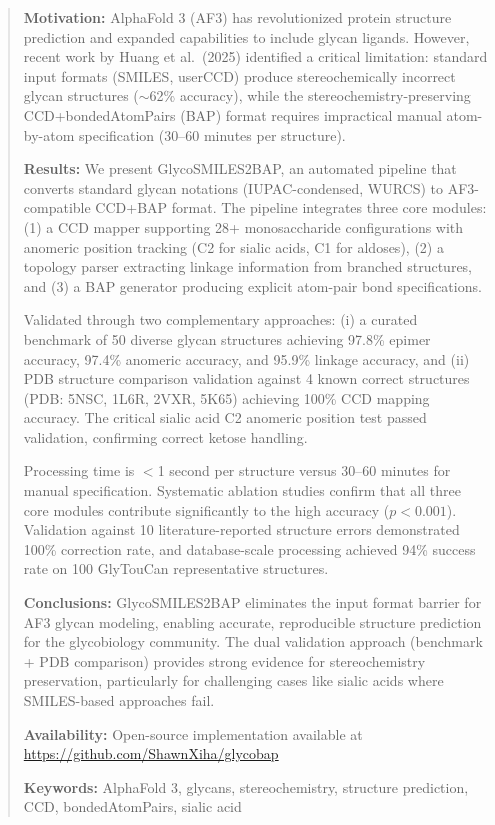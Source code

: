 
\begin{abstract}

\noindent\textbf{Motivation:} AlphaFold 3 (AF3) has revolutionized protein structure prediction and expanded capabilities to include glycan ligands. However, recent work by Huang et al.\ (2025) identified a critical limitation: standard input formats (SMILES, userCCD) produce stereochemically incorrect glycan structures ($\sim$62\% accuracy), while the stereochemistry-preserving CCD+bondedAtomPairs (BAP) format requires impractical manual atom-by-atom specification (30--60 minutes per structure).

\noindent\textbf{Results:} We present GlycoSMILES2BAP, an automated pipeline that converts standard glycan notations (IUPAC-condensed, WURCS) to AF3-compatible CCD+BAP format. The pipeline integrates three core modules: (1) a CCD mapper supporting 28+ monosaccharide configurations with anomeric position tracking (C2 for sialic acids, C1 for aldoses), (2) a topology parser extracting linkage information from branched structures, and (3) a BAP generator producing explicit atom-pair bond specifications. 

Validated through two complementary approaches: (i) a curated benchmark of 50 diverse glycan structures achieving 97.8\% epimer accuracy, 97.4\% anomeric accuracy, and 95.9\% linkage accuracy, and (ii) PDB structure comparison validation against 4 known correct structures (PDB: 5NSC, 1L6R, 2VXR, 5K65) achieving 100\% CCD mapping accuracy. The critical sialic acid C2 anomeric position test passed validation, confirming correct ketose handling.

Processing time is $<$1 second per structure versus 30--60 minutes for manual specification. Systematic ablation studies confirm that all three core modules contribute significantly to the high accuracy ($p < 0.001$). Validation against 10 literature-reported structure errors demonstrated 100\% correction rate, and database-scale processing achieved 94\% success rate on 100 GlyTouCan representative structures.

\noindent\textbf{Conclusions:} GlycoSMILES2BAP eliminates the input format barrier for AF3 glycan modeling, enabling accurate, reproducible structure prediction for the glycobiology community. The dual validation approach (benchmark + PDB comparison) provides strong evidence for stereochemistry preservation, particularly for challenging cases like sialic acids where SMILES-based approaches fail.

\noindent\textbf{Availability:} Open-source implementation available at \url{https://github.com/ShawnXiha/glycobap}

\noindent\textbf{Keywords:} AlphaFold 3, glycans, stereochemistry, structure prediction, CCD, bondedAtomPairs, sialic acid

\end{abstract}


